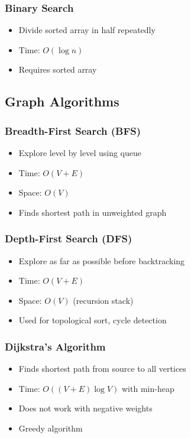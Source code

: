 \documentclass[11pt,a4paper]{article}
\begin{document}
\subsubsection{Binary Search}
\begin{itemize}
    \item Divide sorted array in half repeatedly
    \item Time: $O(\log n)$
    \item Requires sorted array
\end{itemize}

\subsection{Graph Algorithms}

\subsubsection{Breadth-First Search (BFS)}
\begin{itemize}
    \item Explore level by level using queue
    \item Time: $O(V + E)$
    \item Space: $O(V)$
    \item Finds shortest path in unweighted graph
\end{itemize}

\subsubsection{Depth-First Search (DFS)}
\begin{itemize}
    \item Explore as far as possible before backtracking
    \item Time: $O(V + E)$
    \item Space: $O(V)$ (recursion stack)
    \item Used for topological sort, cycle detection
\end{itemize}

\subsubsection{Dijkstra's Algorithm}
\begin{itemize}
    \item Finds shortest path from source to all vertices
    \item Time: $O((V + E) \log V)$ with min-heap
    \item Does not work with negative weights
    \item Greedy algorithm
\end{itemize}
\end{document}

